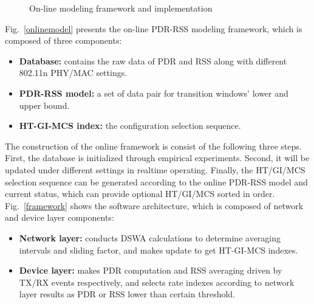 \documentclass[draftclsnofoot,journal,onecolumn,11pt]{IEEEtran}
\begin{document}
\begin{figure}[!htp]
\centerline{
}
\caption{On-line modeling framework and implementation}
\label{implamentation}
\end{figure}

Fig.~\ref{onlinemodel} presents the on-line PDR-RSS modeling framework, which is composed of three components:
\begin{itemize}
  \item \textbf{Database:} contains the raw data of PDR and RSS along with different 802.11n PHY/MAC settings.
  \item \textbf{PDR-RSS model:} a set of data pair for transition windows' lower and upper bound.
  \item \textbf{HT-GI-MCS index:} the configuration selection sequence.
\end{itemize}

The construction of the online framework is consist of the following three steps. First, the database is initialized through empirical experiments. Second, it will be updated under different settings in realtime operating. Finally, the HT/GI/MCS selection sequence can be generated according to the online PDR-RSS model and current status, which can provide optional HT/GI/MCS sorted in order. Fig.~\ref{framework} shows the software architecture, which is composed of network and device layer components:
\begin{itemize}
  \item \textbf{Network layer:} conducts DSWA calculations to determine averaging intervals and sliding factor, and makes update to get HT-GI-MCS indexes.
  \item \textbf{Device layer:} makes PDR computation and RSS averaging driven by TX/RX events respectively, and selects rate indexes according to network layer results as PDR or RSS lower than certain threshold.
\end{itemize}
\end{document}
